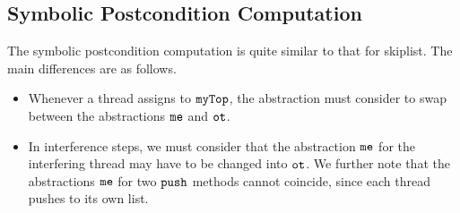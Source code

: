 
\subsection{Symbolic Postcondition Computation}
The symbolic postcondition computation is quite similar to that for skiplist.
The main differences are as follows.
\begin{itemize}
\item
  Whenever a thread assigns to $\tt myTop$, the abstraction must consider
  to swap between the abstractions $\tt me$ and $\tt ot$.
  \item
    In interference steps, we must consider that the abstraction
    $\tt me$ for the interfering thread may have to be changed into $\tt ot$.
    We further note that the abstractions $\tt me$ for two $\tt push$ methods
    cannot coincide, since each thread pushes to its own list.
\end{itemize}

